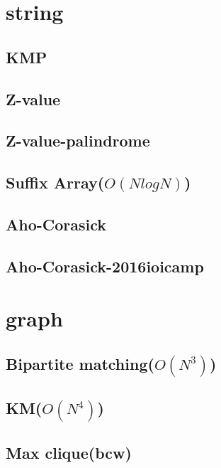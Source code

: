 \documentclass[12pt,twocolumn,oneside]{article}
\begin{document}
\section{string}
\subsection{KMP}


\subsection{Z-value}


\subsection{Z-value-palindrome}


\subsection{Suffix Array(\(O(N log N)\))}


\subsection{Aho-Corasick}


\subsection{Aho-Corasick-2016ioicamp}


\section{graph}
\subsection{Bipartite matching(\(O(N^3)\))}


\subsection{KM(\(O(N^4)\))}


\subsection{Max clique(bcw)}

\end{document}

